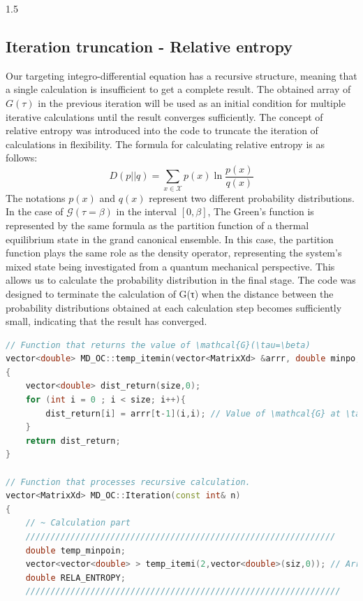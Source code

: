 \documentclass{article}[12pt]
\numberwithin{equation}{section}
\begin{document}
\begin{spacing}{1.5}
\subsection{Iteration truncation - Relative entropy}
Our targeting integro-differential equation has a recursive structure, meaning that a single calculation is insufficient to get a complete result. The obtained array of $G(\tau)$ in the previous iteration will be used as an initial condition for multiple iterative calculations until the result converges sufficiently. The concept of relative entropy was introduced into the code to truncate the iteration of calculations in flexibility. The formula for calculating relative entropy is as follows:
\begin{equation*}
D(p||q) = \sum_{x\in\mathcal{X}}p(x)\ln\frac{p(x)}{q(x)}
\end{equation*}
The notations $p(x)$ and $q(x)$ represent two different probability distributions.
In the case of $\mathcal{G}(\tau = \beta)$ in the interval $[0,\beta]$, The Green's function is represented by the same formula as the partition function of a thermal equilibrium state in the grand canonical ensemble. In this case, the partition function plays the same role as the density operator, representing the system's mixed state being investigated from a quantum mechanical perspective.
This allows us to calculate the probability distribution in the final stage. The code was designed to terminate the calculation of G(τ) when the distance between the probability distributions obtained at each calculation step becomes sufficiently small, indicating that the result has converged.
\begin{lstlisting}[language=C++, caption=Iteration truncation code]
// Function that returns the value of \mathcal{G}(\tau=\beta)
vector<double> MD_OC::temp_itemin(vector<MatrixXd> &arrr, double minpo, int size)
{
    vector<double> dist_return(size,0);
    for (int i = 0 ; i < size; i++){
        dist_return[i] = arrr[t-1](i,i); // Value of \mathcal{G} at \tau = \beta
    }
    return dist_return;
}

// Function that processes recursive calculation.
vector<MatrixXd> MD_OC::Iteration(const int& n)
{
    // ~ Calculation part
    //////////////////////////////////////////////////////////////
    double temp_minpoin;
    vector<vector<double> > temp_itemi(2,vector<double>(siz,0)); // Arrays to store the results of the previous and current iteration. siz represents the dimension of the calculated square matrix.
    double RELA_ENTROPY;
    ///////////////////////////////////////////////////////////////
    

\end{lstlisting}
\end{spacing}
\end{document}
